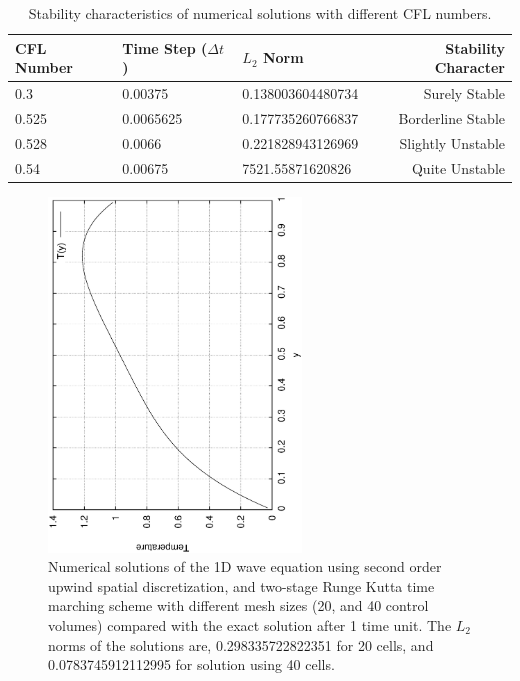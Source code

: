 \documentclass[a4paper,10pt]{article}
\begin{document}
  \begin{table}
      \begin{center}
        \begin{tabular}{|l | l | l | r |}
          \hline
          CFL Number & Time Step ($\Delta t$) & $L_2$ Norm & Stability Character\\
          \hline
          0.3 & 0.00375 & 0.138003604480734 & Surely Stable \\
          0.525 & 0.0065625  & 0.177735260766837 & Borderline Stable \\
          0.528 & 0.0066 & 0.221828943126969 & Slightly Unstable \\
          0.54 & 0.00675 & 7521.55871620826 & Quite Unstable \\
          \hline
        \end{tabular}
        \caption{Stability characteristics of numerical solutions with different CFL numbers.}
        \label{table:norm}      
      \end{center}
    \end{table}

\begin{figure}
  \centering
  \includegraphics[width=0.6\textwidth, angle = -90]{../plots/temp/Temp.eps}
  \caption{Numerical solutions of the 1D wave equation using second order upwind spatial discretization, and two-stage Runge Kutta time marching scheme with different mesh sizes (20, and 40 control volumes) compared with the exact solution after 1 time unit. The $L_2$ norms of the solutions are, 0.298335722822351 for 20 cells, and 0.0783745912112995 for solution using 40 cells.}                
  \label{solution}
\end{figure}
\end{document}
